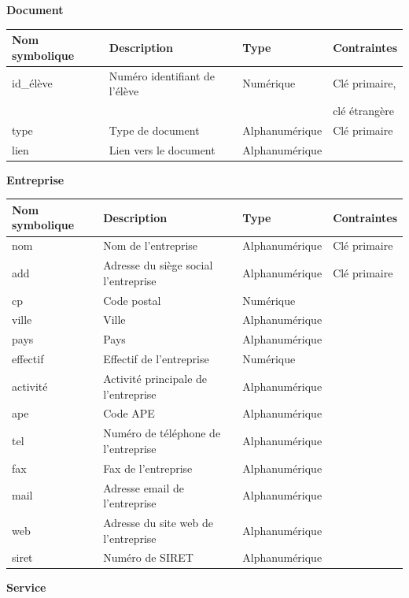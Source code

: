 \documentclass{scrreprt}
\begin{document}
\begin{flushleft}
\textbf{Document}
\end{flushleft}

\begin{tabular}{|l|l|l|l|}
\hline
\textbf{Nom symbolique} & \textbf{Description} & \textbf{Type} & \textbf{Contraintes} \\
\hline
id\_élève & Numéro identifiant de l’élève & Numérique & Clé primaire,\\
&&& clé étrangère \\
type & Type de document & Alphanumérique & Clé primaire \\
lien & Lien vers le document & Alphanumérique & \\
\hline
\end{tabular}

\newpage
\begin{flushleft}
\textbf{Entreprise}
\end{flushleft}

\begin{tabular}{|l|l|l|l|}
\hline
\textbf{Nom symbolique} & \textbf{Description} & \textbf{Type} & \textbf{Contraintes} \\
\hline
nom & Nom de l'entreprise & Alphanumérique & Clé primaire \\
add & Adresse du siège social l’entreprise & Alphanumérique & Clé primaire \\
cp & Code postal & Numérique & \\
ville & Ville & Alphanumérique & \\
pays & Pays & Alphanumérique & \\
effectif & Effectif de l'entreprise & Numérique & \\
activité & Activité principale de l'entreprise & Alphanumérique & \\
ape & Code APE & Alphanumérique & \\
tel &  Numéro de téléphone de l'entreprise & Alphanumérique & \\
fax & Fax de l'entreprise & Alphanumérique & \\
mail & Adresse email de l’entreprise & Alphanumérique & \\
web & Adresse du site web de l'entreprise & Alphanumérique & \\
siret & Numéro de SIRET & Alphanumérique & \\
\hline
\end{tabular}

\begin{flushleft}
\textbf{Service}
\end{flushleft}
\end{document}
